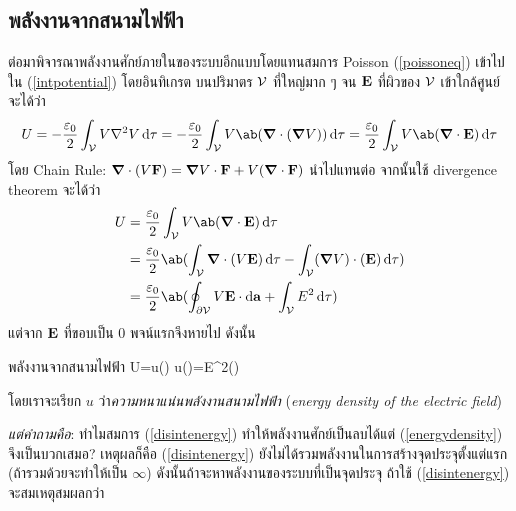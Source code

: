 \subsection{พลังงานจากสนามไฟฟ้า}
ต่อมาพิจารณาพลังงานศักย์ภายในของระบบอีกแบบโดยแทนสมการ Poisson (\ref{poissoneq}) เข้าไปใน (\ref{intpotential}) โดยอินทิเกรต บนปริมาตร $\mathcal{V}$ ที่ใหญ่มาก ๆ จน $\mathbf{E}$ ที่ผิวของ $\mathcal{V}$ เข้าใกล้ศูนย์ จะได้ว่า
\[ 
U=-\frac{\eps_0}{2}\int_\vol V\nabla^2 V\odif{\tau}=-\frac{\eps_0}{2}\int_\vol V\ab(\gd\cdot(\gd V))\odif{\tau}=\frac{\eps_0}{2}\int_\vol V\ab(\gd\cdot\vb{E})\odif{\tau}
\]
โดย Chain Rule: $\boldsymbol{\nabla}\cdot( V\mathbf{F})=\boldsymbol{\nabla} V\cdot\mathbf{F}+ V(\boldsymbol{\nabla}\cdot\mathbf{F})$ นำไปแทนต่อ จากนั้นใช้ divergence theorem จะได้ว่า
\begin{align*}
    U&=\frac{\eps_0}{2}\int_\vol V\ab(\gd\cdot\vb{E})\odif{\tau}\\
    &=\frac{\eps_0}{2}\ab(\int_\vol\gd\cdot( V\vb{E})\odif{\tau}-\int_\vol(\gd V)\cdot(\vb{E})\odif{\tau})\\
    &=\frac{\eps_0}{2}\ab(\oint_{\del\vol} V\vb{E}\cdot\odif{\vb{a}}+\int_\vol E^2\odif{\tau})
\end{align*}
แต่จาก $\mathbf{E}$ ที่ขอบเป็น $0$ พจน์แรกจึงหายไป ดังนั้น
\begin{ieqbox}{พลังงานจากสนามไฟฟ้า}
    U=\int u()\odif{\tau} u()=E^2()\label{energydensity}
\end{ieqbox}
โดยเราจะเรียก $u$ ว่า\emph{ความหนาแน่นพลังงานสนามไฟฟ้า} (\emph{energy density of the electric field})

\emph{แต่คำถามคือ}: ทำไมสมการ (\ref{disintenergy}) ทำให้พลังงานศักย์เป็นลบได้แต่ (\ref{energydensity}) จึงเป็นบวกเสมอ? เหตุผลก็คือ (\ref{disintenergy}) ยังไม่ได้รวมพลังงานในการสร้างจุดประจุตั้งแต่แรก (ถ้ารวมด้วยจะทำให้เป็น $\infty$) ดังนั้นถ้าจะหาพลังงานของระบบที่เป็นจุดประจุ ถ้าใช้ (\ref{disintenergy}) จะสมเหตุสมผลกว่า

